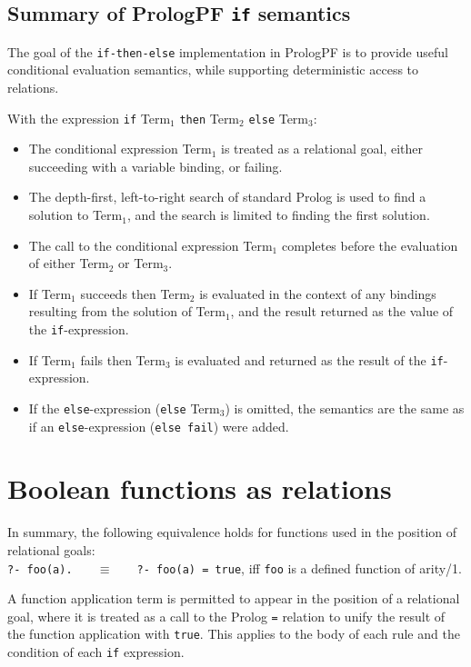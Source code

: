 \subsection{Summary of PrologPF \texttt{if} semantics}

The goal of the \texttt{if-then-else} implementation in PrologPF is to
provide useful conditional evaluation semantics, while supporting
deterministic access to relations.

With the expression 
\texttt{if} Term$_1$ \texttt{then} Term$_2$ \texttt{else} Term$_3$:
\begin{itemize}
\item{The conditional expression Term$_1$ is treated as a relational goal, either
  succeeding with a variable binding, or failing.}
\item{The depth-first, left-to-right search of standard Prolog is used to find
  a solution to Term$_1$, and the search is limited to finding the first solution.}
\item{The call to the conditional expression Term$_1$ completes before the evaluation
  of either Term$_2$ or Term$_3$.}
\item{If Term$_1$ succeeds then Term$_2$ is evaluated in the context of any bindings
  resulting from the solution of Term$_1$, and the result returned as the value of the
  \texttt{if}-expression.}
\item{If Term$_1$ fails then Term$_3$ is evaluated and returned as the result of the
  \texttt{if}-expression.}
\item{If the \texttt{else}-expression (\texttt{else} Term$_3$) is omitted, the semantics are
  the same as if an \texttt{else}-expression (\texttt{else fail}) were added.}
\end{itemize}

\section{Boolean functions as relations} %
\label{bool}

In summary, the following equivalence holds for functions used in
the position of relational goals:\\
 \texttt{?- foo(a).~~~} $\equiv$ \texttt{~~~?- foo(a) = true},
iff \texttt{foo} is a defined function of arity/1.

A function application term is permitted to appear in the position of
a relational goal, where it is treated as a call to the Prolog \texttt{=}
relation to unify the result of the function application with \texttt{true}.
This applies to the body of each rule and the condition of each \texttt{if}
expression.

